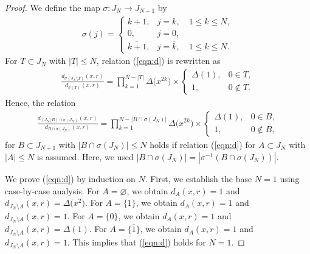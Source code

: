 \documentclass[pdftex]{sigma}
\numberwithin{equation}{section}
\begin{document}
\begin{proof}
We define the map $\sigma \colon J_N \to J_{N+1}$ by
\begin{gather*}
\sigma(j)=\begin{cases}
k+1,&j=k,\quad 1\leq k \leq N,
\\
0,&j=0,
\\
\overline{k+1},&j=\overline{k},\quad 1\leq k \leq N.
\end{cases}
\end{gather*}
For $T\subset J_N$ with
$|T|\leq N$, relation (\ref{eqn:d}) is rewritten as
\begin{gather*}
\frac{d_{{\sigma(J_N \setminus T)}}(x,r)}{d_{\sigma(T)}(x,r)}=\prod_{k=1}^{N-|T|}
\Delta\big(x^{2k}\big)\times
\begin{cases}
\Delta(1),& 0 \in T,
\\
1,&0 \notin T.
\end{cases}
\end{gather*}
Hence, the relation
\begin{gather}
\frac{d_{{(J_N \setminus B)\cap \sigma(J_N)}}(x,r)}{d_{B \cap \sigma(J_N)}(x,r)}=
\prod_{k=1}^{N-|B \cap \sigma(J_N)|}
\Delta\big(x^{2k}\big)\times
\begin{cases}
\Delta(1),& 0 \in B,\\
1,& 0 \notin B,
\end{cases}
\label{eqn:d2}
\end{gather}
for $B \subset J_{N+1}$ with $|B \cap \sigma(J_N)|\leq N$ holds
if relation (\ref{eqn:d}) for $A \subset J_N$ with $|A|\leq N$ is assumed.
Here, we used $|B\cap \sigma(J_N)|=|\sigma^{-1}(B\cap \sigma(J_N))|$.

We prove (\ref{eqn:d}) by induction on $N$.
First, we establish the base $N=1$ using case-by-case analysis.
For $A=\varnothing$, we obtain $d_A(x,r)=1$ and $d_{J_N \setminus A}(x,r)=\Delta\big(x^2\big)$.
For $A=\{1\}$, we obtain $d_A(x,r)=1$ and $d_{J_N \setminus A}(x,r)=1$.
For $A=\{0\}$, we obtain $d_A(x,r)=1$ and $d_{J_N \setminus A}(x,r)=\Delta(1)$.
For $A=\{\overline{1}\}$, we obtain $d_A(x,r)=1$ and $d_{J_N \setminus A}(x,r)=1$.
This implies that (\ref{eqn:d}) holds for $N=1$.


\end{proof}
\end{document}
